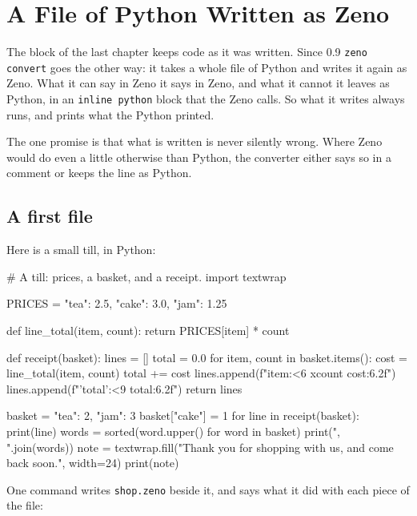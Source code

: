 \chapter{A File of Python Written as Zeno}\label{ch-convert}

The block of the last chapter keeps code as it was written. Since 0.9
\verb|zeno convert| goes the other way: it takes a whole file of
Python and writes it again as Zeno. What it can say in Zeno it says
in Zeno, and what it cannot it leaves as Python, in an
\verb|inline python| block that the Zeno calls. So what it writes
always runs, and prints what the Python printed.

\begin{note}
The one promise is that what is written is never silently wrong.
Where Zeno would do even a little otherwise than Python, the converter
either says so in a comment or keeps the line as Python.
\end{note}

\section{A first file}

Here is a small till, in Python:

\begin{zeno}[file=shop.py, dir=convert, run=no]
# A till: prices, a basket, and a receipt.
import textwrap

PRICES = {"tea": 2.5, "cake": 3.0, "jam": 1.25}


def line_total(item, count):
    return PRICES[item] * count


def receipt(basket):
    lines = []
    total = 0.0
    for item, count in basket.items():
        cost = line_total(item, count)
        total += cost
        lines.append(f"{item:<6} x{count}  {cost:6.2f}")
    lines.append(f"{'total':<9} {total:6.2f}")
    return lines


basket = {"tea": 2, "jam": 3}
basket["cake"] = 1
for line in receipt(basket):
    print(line)
words = sorted(word.upper() for word in basket)
print(", ".join(words))
note = textwrap.fill("Thank you for shopping with us, and come back soon.", width=24)
print(note)
\end{zeno}

One command writes \verb|shop.zeno| beside it, and says what it did
with each piece of the file:


